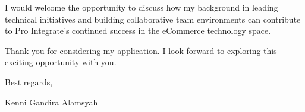 \documentclass[12pt]{article}
\newcommand{\svspace}{\vspace*{0.5em}}
\begin{document}
\svspace

I would welcome the opportunity to discuss how my background in leading technical initiatives and building collaborative team environments can contribute to Pro Integrate's continued success in the eCommerce technology space.

\svspace

Thank you for considering my application. I look forward to exploring this exciting opportunity with you.

\svspace

Best regards,

\svspace

Kenni Gandira Alamsyah
\end{document}

